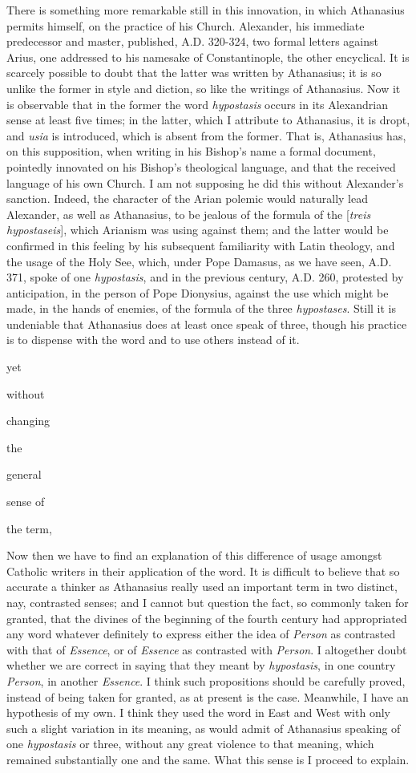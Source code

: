 There is something more remarkable still in
this innovation, in which Athanasius permits himself, on the
practice of his Church. Alexander, his immediate predecessor
and master, published, A.D.
320-324, two formal letters against Arius, one addressed to
his namesake of Constantinople, the other encyclical. It is
scarcely possible to doubt that the latter was written by
Athanasius; it is so unlike the former in style and diction,
so like the writings of Athanasius. Now it is observable that
in the former the word \emph{hypostasis} occurs in its
Alexandrian sense at least five times; in the latter,
which I attribute to Athanasius, it is dropt, and \emph{usia}
is introduced, which is absent from the former. That is,
Athanasius has, on this supposition, when writing in his
Bishop's name a formal document, pointedly innovated on his
Bishop's theological language, and that the received language
of his own Church. I am not supposing he did this without
Alexander's sanction. Indeed, the character of the Arian
polemic would naturally lead Alexander, as well as Athanasius,
to be jealous of the formula of the [\emph{treis hypostaseis}],
which Arianism was using against them; and the latter would be
confirmed in this feeling by his subsequent familiarity with
Latin theology, and the usage of the Holy See, which, under
Pope Damasus, as we have seen, A.D. 371, spoke of one \emph{hypostasis}, and
in the previous century, A.D. 260, protested by
anticipation, in the person of Pope Dionysius, against the use
which might be made, in the hands of enemies, of the formula
of the three \emph{hypostases}. Still it is undeniable that
Athanasius does at least once speak of three, though his
practice is to dispense with the word and to use others
instead of it.

yet

without

changing

the

general

sense of 

the term,

Now then we have to find an explanation of
this difference of usage amongst Catholic writers in their
application of the word. It is difficult to believe that so
accurate a thinker as Athanasius really used an important term
in two distinct, nay, contrasted senses; and I cannot but
question the fact, so commonly taken for granted, that the
divines of the beginning of the fourth century had
appropriated any word whatever definitely to express either
the idea of \emph{Person} as contrasted with that of \emph{Essence},
or of \emph{Essence} as contrasted with \emph{Person}. I
altogether doubt whether we are correct in saying that they
meant by \emph{hypostasis}, in one country \emph{Person}, in
another \emph{Essence}. I think such propositions should be
carefully proved, instead of being taken for granted, as at
present is the case. Meanwhile, I have an hypothesis of my
own. I think they used the word in East and West with only
such a slight variation in its meaning, as would admit of
Athanasius speaking of one \emph{hypostasis} or three, without
any great violence to that meaning, which remained
substantially one and the same. What this sense is I proceed
to explain.

